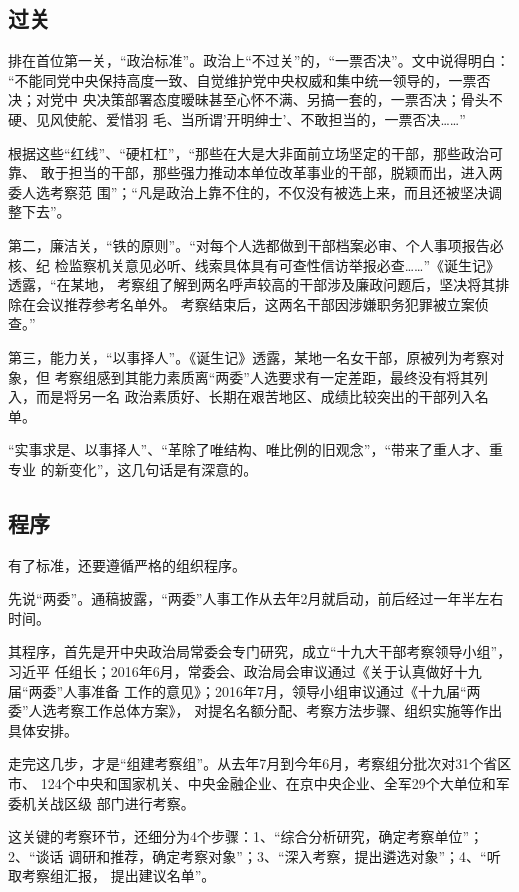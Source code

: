 \documentclass[11pt]{ctexart}
\begin{document}
{{{{\subsection{过关}
\label{sec:orgdf50eab}

排在首位第一关，“政治标准”。政治上“不过关”的，“一票否决”。文中说得明白：
“不能同党中央保持高度一致、自觉维护党中央权威和集中统一领导的，一票否决；对党中
央决策部署态度暧昧甚至心怀不满、另搞一套的，一票否决；骨头不硬、见风使舵、爱惜羽
毛、当所谓’开明绅士’、不敢担当的，一票否决……”

根据这些“红线”、“硬杠杠”，“那些在大是大非面前立场坚定的干部，那些政治可靠、
敢于担当的干部，那些强力推动本单位改革事业的干部，脱颖而出，进入两委人选考察范
围”；“凡是政治上靠不住的，不仅没有被选上来，而且还被坚决调整下去”。

第二，廉洁关，“铁的原则”。“对每个人选都做到干部档案必审、个人事项报告必核、纪
检监察机关意见必听、线索具体具有可查性信访举报必查……”《诞生记》透露，“在某地，
考察组了解到两名呼声较高的干部涉及廉政问题后，坚决将其排除在会议推荐参考名单外。
考察结束后，这两名干部因涉嫌职务犯罪被立案侦查。”

第三，能力关，“以事择人”。《诞生记》透露，某地一名女干部，原被列为考察对象，但
考察组感到其能力素质离“两委”人选要求有一定差距，最终没有将其列入，而是将另一名
政治素质好、长期在艰苦地区、成绩比较突出的干部列入名单。

“实事求是、以事择人”、“革除了唯结构、唯比例的旧观念”，“带来了重人才、重专业
的新变化”，这几句话是有深意的。



\subsection{程序}
\label{sec:org3337747}

有了标准，还要遵循严格的组织程序。

先说“两委”。通稿披露，“两委”人事工作从去年2月就启动，前后经过一年半左右时间。

其程序，首先是开中央政治局常委会专门研究，成立“十九大干部考察领导小组”，习近平
任组长；2016年6月，常委会、政治局会审议通过《关于认真做好十九届“两委”人事准备
工作的意见》；2016年7月，领导小组审议通过《十九届“两委”人选考察工作总体方案》，
对提名名额分配、考察方法步骤、组织实施等作出具体安排。

走完这几步，才是“组建考察组”。从去年7月到今年6月，考察组分批次对31个省区市、
124个中央和国家机关、中央金融企业、在京中央企业、全军29个大单位和军委机关战区级
部门进行考察。

这关键的考察环节，还细分为4个步骤：1、“综合分析研究，确定考察单位”；2、“谈话
调研和推荐，确定考察对象”；3、“深入考察，提出遴选对象”；4、“听取考察组汇报，
提出建议名单”。

}}}}
\end{document}
